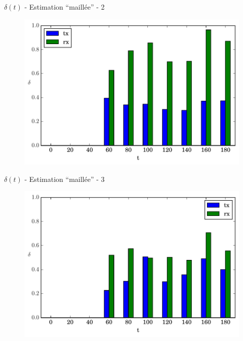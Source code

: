 \begin{frame}{$\delta(t)$ - Estimation ``maillée'' - 2}
  \begin{figure}
    \centering  
    \includegraphics[width=\textwidth]{figures/evolution_route_2.pdf}
  \end{figure}
\end{frame}

\begin{frame}{$\delta(t)$ - Estimation ``maillée'' - 3}
  \begin{figure}
    \centering  
    \includegraphics[width=\textwidth]{figures/evolution_route_3.pdf}
  \end{figure}
\end{frame}

